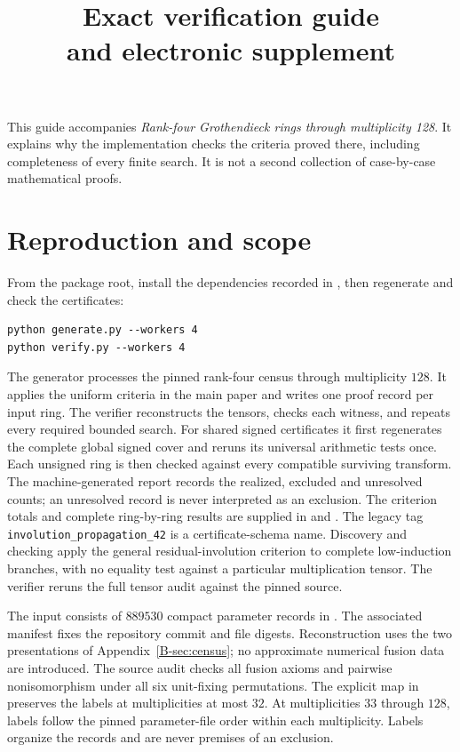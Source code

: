 \documentclass[11pt]{article}
\title{Exact verification guide\\and electronic supplement}
\date{}
\begin{document}
\maketitle
This guide accompanies \emph{Rank-four Grothendieck rings through
multiplicity 128}. It explains why the implementation checks the
criteria proved there, including completeness of every finite search.
It is not a second collection of case-by-case mathematical proofs.

\section{Reproduction and scope}
From the package root, install the dependencies recorded in
, then regenerate and check the certificates:
\begin{verbatim}
python generate.py --workers 4
python verify.py --workers 4
\end{verbatim}
The generator processes the pinned rank-four census through multiplicity
$128$. It applies the uniform criteria in the main paper and writes
one proof record per input ring. The verifier reconstructs the tensors,
checks each witness, and repeats every required bounded search.
For shared signed certificates it first regenerates the complete global
signed cover and reruns its universal arithmetic tests once. Each
unsigned ring is then checked against every compatible surviving
transform. The machine-generated report  records
the realized, excluded and unresolved counts; an unresolved record is
never interpreted as an exclusion. The criterion totals and complete
ring-by-ring results are supplied in
 and
.
The legacy tag \texttt{involution\_propagation\_42} is a certificate-schema
name. Discovery and checking apply the general residual-involution
criterion to complete low-induction branches, with no equality test against
a particular multiplication tensor.
The verifier reruns the full tensor audit against the pinned source.

The input consists of $889530$ compact parameter records in
. The associated manifest fixes the
repository commit and file digests. Reconstruction uses the two
presentations of Appendix~\ref{B-sec:census}; no approximate numerical
fusion data are introduced. The source audit checks all fusion axioms
and pairwise nonisomorphism under all six unit-fixing permutations.
The explicit map in  preserves the
labels at multiplicities at most $32$. At multiplicities $33$ through
$128$, labels follow the pinned parameter-file order within each
multiplicity. Labels organize the records and are never premises of
an exclusion.
\end{document}

